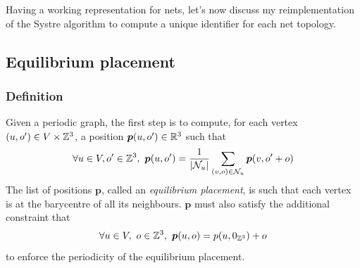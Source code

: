 \documentclass[main.tex]{subfiles}
\begin{document}

Having a working representation for nets, let's now discuss my reimplementation of the Systre algorithm \autocite{Systre} to compute a unique identifier for each net topology.



\subsection{Equilibrium placement}

\subsubsection{Definition}

Given a periodic graph, the first step is to compute, for each vertex $(u,o')\in V\times\mathbb{Z}^3$, a position $\boldsymbol p(u,o')\in\mathbb{R}^3$ such that
\begin{equation}
	\forall u\in V,o'\in\mathbb{Z}^3,\ \boldsymbol p(u,o') = \frac1{\left|\mathcal N_{u}\right|}\sum_{(v,o)\in \mathcal N_{u}}\boldsymbol p(v,o'+o)
	\label{equilibrium1}
\end{equation}
The list of positions $\boldsymbol p$, called an \emph{equilibrium placement}, is such that each vertex is at the barycentre of all its neighbours. $\boldsymbol p$ must also satisfy the additional constraint that
\begin{equation}
	\forall u\in V,\ o\in\mathbb{Z}^3,\ \boldsymbol p(u,o) = p(u,0_{\mathbb{Z}^3}) + o
	\label{equilibrium2}
\end{equation}
to enforce the periodicity of the equilibrium placement.
\end{document}
